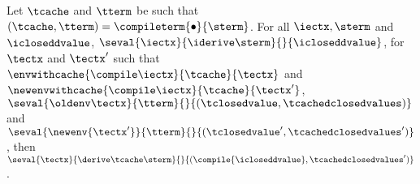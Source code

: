 \begin{theorem}
  \label{thm:soundness-compiled-changesfinal}
  Let $\tcache$ and $\tterm$ be such that 
  $(\tcache, \tterm) = \compileterm{\bullet}{\sterm}$.
  For all $\iectx, \sterm$ and $\icloseddvalue$,
  $\seval{\iectx}{\iderive\sterm}{}{\icloseddvalue}$,
  for $\tectx$ and $\tectx'$ such that
  $\envwithcache{\compile\iectx}{\tcache}{\tectx}$
  and $\newenvwithcache{\compile\iectx}{\tcache}{\tectx'}$,
  $\seval{\oldenv\tectx}{\tterm}{}{(\tclosedvalue, \tcachedclosedvalues)}$ and
  $\seval{\newenv{\tectx'}}{\tterm}{}{(\tclosedvalue', \tcachedclosedvalues')}$,
  then
  $
  \seval{\tectx}{\derive\tcache\sterm}{}{(\compile{\icloseddvalue}, \tcachedclosedvalues')}
  $.
\end{theorem}
